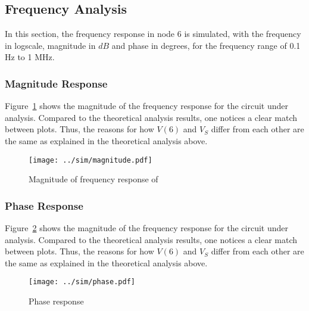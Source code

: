 \subsection{Frequency Analysis}

In this section, the frequency response in node 6 is simulated, with the frequency in logscale, magnitude in $dB$ and phase in degrees, for the frequency range of 0.1 Hz to 1 MHz.


\subsubsection{Magnitude Response}

Figure~\ref{fig:magsim} shows the magnitude of the frequency response for the circuit under analysis. Compared to the theoretical analysis results, one notices a clear match between plots. Thus, the reasons for how $V(6)$ and $V_S$ differ from each other are the same as explained in the theoretical analysis above.

\begin{figure}[h] \centering
\texttt{[image: ../sim/magnitude.pdf]}
\caption{Magnitude of frequency response of }
\label{fig:magsim}
\end{figure}

\subsubsection{Phase Response}

Figure~\ref{fig:phasesim} shows the magnitude of the frequency response for the circuit under analysis. Compared to the theoretical analysis results, one notices a clear match between plots. Thus, the reasons for how $V(6)$ and $V_S$ differ from each other are the same as explained in the theoretical analysis above.

\begin{figure}[h] \centering
\texttt{[image: ../sim/phase.pdf]}
\caption{Phase response}
\label{fig:phasesim}
\end{figure}

